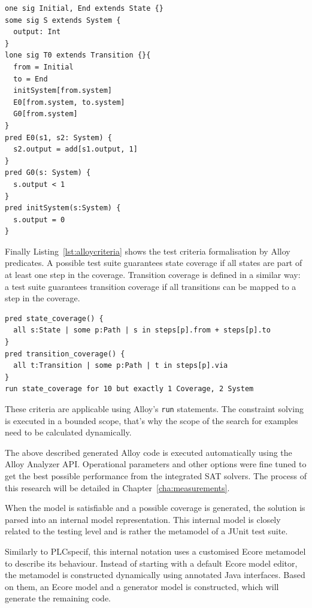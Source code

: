 \begin{lstlisting}[label={lst:alloydynamic}, caption=Dynamic parts of the generated Alloy code,breaklines=true]
one sig Initial, End extends State {}
some sig S extends System {
  output: Int
}
lone sig T0 extends Transition {}{
  from = Initial
  to = End
  initSystem[from.system]
  E0[from.system, to.system]
  G0[from.system]
}
pred E0(s1, s2: System) {
  s2.output = add[s1.output, 1]	
}
pred G0(s: System) {
  s.output < 1
}
pred initSystem(s:System) {
  s.output = 0
}
\end{lstlisting}

Finally Listing~\ref{lst:alloycriteria} shows the test criteria formalisation by Alloy predicates. A possible test suite guarantees state coverage if all states are part of at least one step in the coverage. Transition coverage is defined in a similar way: a test suite guarantees transition coverage if all transitions can be mapped to a step in the coverage.

\begin{lstlisting}[label={lst:alloycriteria}, caption=Formalising criteria with Alloy,breaklines=true]
pred state_coverage() {
  all s:State | some p:Path | s in steps[p].from + steps[p].to
}
pred transition_coverage() {
  all t:Transition | some p:Path | t in steps[p].via
}
run state_coverage for 10 but exactly 1 Coverage, 2 System
\end{lstlisting}

These criteria are applicable using Alloy's \texttt{run} statements. The constraint solving is executed in a bounded scope, that's why the scope of the search for examples need to be calculated dynamically.

The above described generated Alloy code is executed automatically using the Alloy Analyzer API. Operational parameters and other options were fine tuned to get the best possible performance from the integrated SAT solvers. The process of this research will be detailed in Chapter~\ref{cha:measurements}.

When the model is satisfiable and a possible coverage is generated, the solution is parsed into an internal model representation. This internal model is closely related to the testing level and is rather the metamodel of a JUnit test suite.

Similarly to PLCspecif, this internal notation uses a customised Ecore metamodel to describe its behaviour. Instead of starting with a default Ecore model editor, the metamodel is constructed dynamically using annotated Java interfaces. Based on them, an Ecore model and a generator model is constructed, which will generate the remaining code.

